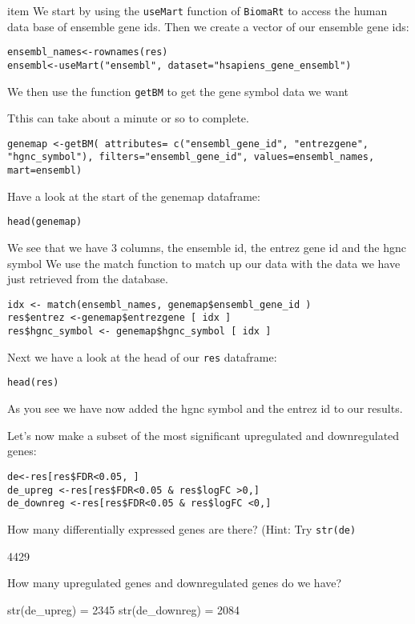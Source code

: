 \begin{steps}
item We start by using the \texttt{useMart} function of \texttt{BiomaRt} to access the
human data base of ensemble gene ids. Then we create a vector of our ensemble gene ids:
\begin{lstlisting}
ensembl_names<-rownames(res)
ensembl<-useMart("ensembl", dataset="hsapiens_gene_ensembl")
\end{lstlisting}

We then use the function \texttt{getBM} to get the gene symbol data we want 
\begin{note}
Tthis can take about a minute or so to complete.
\end{note}
\begin{lstlisting}
genemap <-getBM( attributes= c("ensembl_gene_id", "entrezgene", "hgnc_symbol"), filters="ensembl_gene_id", values=ensembl_names, mart=ensembl)
\end{lstlisting}

Have a look at the start of the genemap dataframe:
\begin{lstlisting}
head(genemap)
\end{lstlisting}

We see that we have 3 columns, the ensemble id, the entrez gene id and the hgnc symbol
We use the match function to match up our data with the data we have just retrieved from
the database.

\begin{lstlisting}
idx <- match(ensembl_names, genemap$ensembl_gene_id )
res$entrez <-genemap$entrezgene [ idx ]
res$hgnc_symbol <- genemap$hgnc_symbol [ idx ]
\end{lstlisting}

Next we have a look at the head of our \texttt{res} dataframe:
\begin{lstlisting}
head(res)
\end{lstlisting}
As you see we have now added the hgnc symbol and the entrez id to our results.




Let's now make a subset of the most significant upregulated and downregulated genes:
\begin{lstlisting}
de<-res[res$FDR<0.05, ]
de_upreg <-res[res$FDR<0.05 & res$logFC >0,] 
de_downreg <-res[res$FDR<0.05 & res$logFC <0,] 
\end{lstlisting}

\end{steps}

\begin{questions}
How many differentially expressed genes are there? (Hint: Try \texttt{str(de)}
\begin{answer}
4429
\end{answer}

How many upregulated genes and downregulated genes do we have?
\begin{answer}
str(de\_upreg) = 2345
str(de\_downreg) = 2084
\end{answer}

\end{questions}

